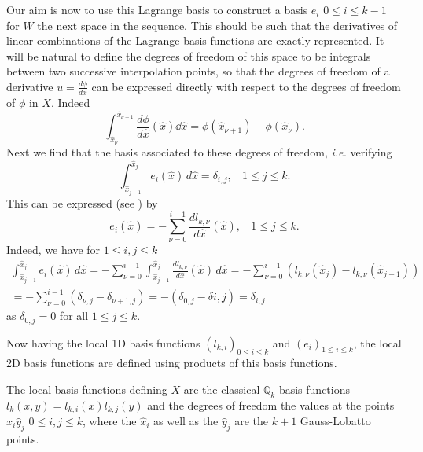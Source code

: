 Our aim is now to use this Lagrange basis to construct a basis $e_{i}$  $0\leq i \leq k-1$ for $W$ the next space in the sequence. This should be such that the derivatives of linear combinations of the Lagrange basis functions are exactly represented. It will be natural to define the degrees of freedom of this space to be integrals between two successive interpolation points, so that the degrees of freedom of a derivative $u=\frac{d\phi}{dx}$ can be expressed directly with respect to the degrees of freedom of $\phi$ in $X$. Indeed 
$$\int_{\hat{x}_\nu}^{\hat{x}_{\nu+1}} \frac{d\phi}{d\hat{x}}(\hat{x}) \dd \hat{x}= \phi(\hat{x}_{\nu+1}) - \phi(\hat{x}_{\nu}).$$
Next we find that the basis associated to these degrees of freedom, \textit{ i.e. } verifying 
$$\int _{\hat{x}_{j-1}}^{\hat{x}_{j}} e_i( \hat{x}) \, d\hat{x} = \delta_{i,j}, ~~~~ 1\leq j\leq k.$$
This can be expressed (see \cite{gerritsma2011}) by
\begin{equation}
e_i( \hat{x}) = -\sum_{\nu=0}^{i-1} \frac{dl_{k,\nu}}{d\hat{x}}( \hat{x}),~~~~ 1\leq j\leq k.
\end{equation}
Indeed, we have for $1\leq i,j \leq k$
\begin{multline*}
 \int _{\hat{x}_{j-1}}^{\hat{x}_{j}} e_i( \hat{x})  \, d\hat{x} = -\sum_{\nu=0}^{i-1} \int _{\hat{x}_{j-1}}^{\hat{x}_{j}} \frac{dl_{k,\nu}}{d\hat{x}}( \hat{x})  \, d\hat{x}   = -\sum_{\nu=0}^{i-1} (l_{k,\nu}(\hat{x}_j) - l_{k,\nu}(\hat{x}_{j-1})) \\
 = -\sum_{\nu=0}^{i-1} (\delta_{\nu,j}-\delta_{\nu+1,j}) = -(\delta_{0,j}-\delta{i,j}) = \delta_{i,j}
\end{multline*}
as $\delta_{0,j}=0$ for all $1\leq j \leq k$.

Now having the local 1D basis functions $(l_{k,i})_{0\leq i \leq k}$ and $(e_{i})_{1\leq i \leq k}$, the local 2D basis functions are defined using products of this basis functions.

The local basis functions defining $X$ are the classical $ \mathbb{Q}_k$ basis functions
$l_k(x,y)= l_{k,i}(x) l_{k,j}(y)$ and the degrees of freedom the values at the points $\hat{x}_i \hat{y}_j$ $0\leq i,j \leq k$, where the $\hat{x}_i$ as well as the $\hat{y}_j$ are the $k+1$ Gauss-Lobatto points.


